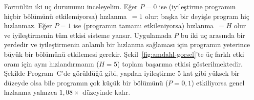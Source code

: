 Formülün iki uç durumunu inceleyelim. Eğer $P = 0$ ise (iyileştirme programın hiçbir bölümünü etkilemiyorsa) hızlanma~$= 1$ olur; başka bir deyişle program hiç hızlanmaz. Eğer $P = 1$ ise (programın tamamı etkileniyorsa) hızlanma~$= H$ olur ve iyileştirmenin tüm etkisi sisteme yansır. Uygulamada $P$ bu iki uç arasında bir yerdedir ve iyileştirmenin anlamlı bir hızlanma sağlaması için programın yeterince büyük bir bölümünü etkilemesi gerekir. Şekil~\ref{fig:amdahl-gorsel}'te üç farklı etki oranı için aynı hızlandırmanın ($H=5$) toplam başarıma etkisi gösterilmektedir. Şekilde Program~C'de görüldüğü gibi, yapılan iyileştirme 5 kat gibi yüksek bir düzeyde olsa bile programın çok küçük bir bölümünü ($P=0{,}1$) etkiliyorsa genel hızlanma yalnızca $1{,}08\times$ düzeyinde kalır.

\begin{figure}[H]
\centering
{}
\end{figure}
